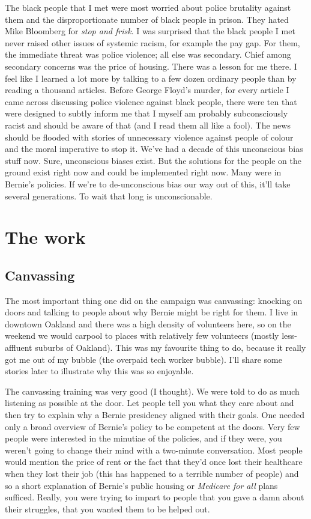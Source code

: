 \documentclass[]{book}
\begin{document}
The black people that I met were most worried about police brutality against them and the disproportionate number of black people in prison. They hated Mike Bloomberg for \emph{stop and frisk}. I was surprised that the black people I met never raised other issues of systemic racism, for example the pay gap. For them, the immediate threat was police violence; all else was secondary. Chief among secondary concerns was the price of housing. There was a lesson for me there. I feel like I learned a lot more by talking to a few dozen ordinary people than by reading a thousand articles. Before George Floyd's murder, for every article I came across discussing police violence against black people, there were ten that were designed to subtly inform me that I myself am probably subconsciously racist and should be aware of that (and I read them all like a fool). The news should be flooded with stories of unnecessary violence against people of colour and the moral imperative to stop it. We've had a decade of this unconscious bias stuff now. Sure, unconscious biases exist. But the solutions for the people on the ground exist right now and could be implemented right now. Many were in Bernie's policies. If we're to de-unconscious bias our way out of this, it'll take several generations. To wait that long is unconscionable.

\hypertarget{the-work}{%
\chapter{The work}\label{the-work}}

\hypertarget{canvassing}{%
\section{Canvassing}\label{canvassing}}

The most important thing one did on the campaign was canvassing: knocking on doors and talking to people about why Bernie might be right for them. I live in downtown Oakland and there was a high density of volunteers here, so on the weekend we would carpool to places with relatively few volunteers (mostly less-affluent suburbs of Oakland). This was my favourite thing to do, because it really got me out of my bubble (the overpaid tech worker bubble). I'll share some stories later to illustrate why this was so enjoyable.

The canvassing training was very good (I thought). We were told to do as much listening as possible at the door. Let people tell you what they care about and then try to explain why a Bernie presidency aligned with their goals. One needed only a broad overview of Bernie's policy to be competent at the doors. Very few people were interested in the minutiae of the policies, and if they were, you weren't going to change their mind with a two-minute conversation. Most people would mention the price of rent or the fact that they'd once lost their healthcare when they lost their job (this has happened to a terrible number of people) and so a short explanation of Bernie's public housing or \emph{Medicare for all} plans sufficed. Really, you were trying to impart to people that you gave a damn about their struggles, that you wanted them to be helped out.
\end{document}
